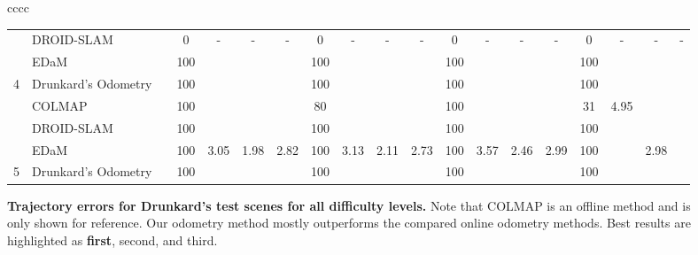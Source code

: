 \documentclass{article}
\begin{document}
\begin{figure}
\begin{tabular}{cccc}
\begin{table*}[!b]
\begin{tabular}{cll cccc@{\groupsep} cccc@{\groupsep} cccc@{\groupsep} cccc}
         & DROID-SLAM~\cite{teed2021droid}   &   &  0  &   -  &   -  &  -  &   0  &   -  &   -  &   -  &   0  &   -  &   -  &   -  &   0  &   -  &   -  &   -   \\ 
         & EDaM~\cite{recasens2021endo}   &   & 100  &  \rd 5.50  &  \rd 2.16  &  \rd 4.85  &  100  &  \rd 5.27  &  \rd 2.27  &  \rd 4.81  &   100  &   \rd 5.39  &  \rd 2.56  &  \rd 4.79 &   100  &   \nd 5.88  & \rd 2.96  &  \rd 4.90  \\ 
         \multirow{-4}{*}{4}& Drunkard’s Odometry  &      & 100  &   \nd 0.60  &   \nd 0.14  &   \nd 1.21  &   100  &   \fs 0.83  &   \nd 0.18  &   \nd 1.39  &   100  &   \fs 1.43  &   \fs 0.28  &   \nd 2.46 &   100  &   \fs 2.26  &   \fs 0.46  &   \nd 4.66  \\ 
        \noalign{\vskip 1mm} 
        \hdashline 
        \noalign{\vskip 1mm}      
         & COLMAP~\cite{schoenberger2016sfm}  &    & 100  &   \fs 0.40  &   \fs 0.08  &   \fs 0.20  &   80  &   \nd 1.12  &   \fs 0.16  &   \fs 0.53  &   100  &   \rd 3.58  &   \nd 0.356  &   \nd 1.38  &   31  &   4.95  &   \fs 0.46  &   \fs 2.45   \\ 
         & DROID-SLAM~\cite{teed2021droid} &    & 100  &   \rd 0.56  &   \rd 0.21  &  \rd 1.25  &   100  &   \rd 1.52  &  \rd 0.39  &  \rd 1.56  &   100  &   \nd 3.16  & \rd 0.67  &  \rd 2.43  &   100  &  \rd 4.69  &  \rd 1.02  & \nd 2.70   \\ 
         & EDaM~\cite{recasens2021endo}   &     & 100  &   3.05  &   1.98  &   2.82  &   100  &   3.13  &   2.11  &   2.73  &   100  &   3.57  &   2.46  &   2.99 &   100  &   \nd 4.12  &   2.98  &   \rd 2.86  \\ 
         \multirow{-4}{*}{5}& Drunkard’s Odometry  &    & 100  &   \nd 0.45  &   \nd 0.13  &   \nd 0.47  &   100  &   \fs 0.74  &   \nd 0.18  &   \nd 0.70  &   100  &   \fs 1.44  &   \fs 0.29  &   \fs 1.24 &   100  &   \fs 2.40  &   \nd 0.49  &   \fs 2.45  \\
        \bottomrule
    \end{tabular}\vspace{-6pt}
    \caption{\textbf{Trajectory errors for Drunkard's test scenes for all difficulty levels.}
    Note that COLMAP is an offline method and is only shown for reference. Our odometry method mostly outperforms the compared online odometry methods.
    Best results are highlighted as \colorbox{colorFst}{\bf first}, \colorbox{colorSnd}{second}, and \colorbox{colorTrd}{third}.}
\label{tab:table_drunk_eval}
\end{table*}




\end{tabular}
\end{figure}
\end{document}
